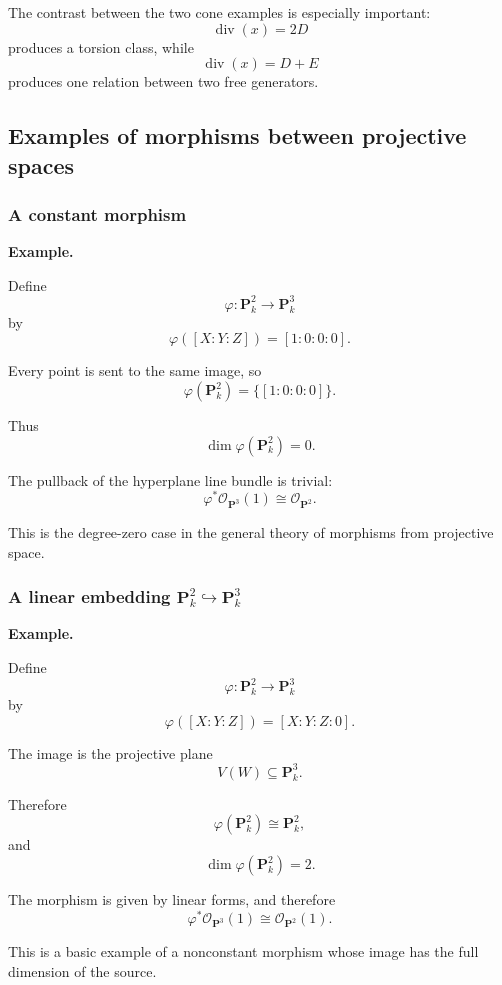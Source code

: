 \documentclass[12pt,a4paper]{article}
\theoremstyle{notespace}
\begin{document}
The contrast between the two cone examples is especially important:
\[
\operatorname{div}(x)=2D
\]
produces a torsion class, while
\[
\operatorname{div}(x)=D+E
\]
produces one relation between two free generators.

\subsection{Examples of morphisms between projective spaces}

\subsubsection{A constant morphism}

\textbf{Example.}

Define
\[
\varphi:\mathbf P^2_k\longrightarrow\mathbf P^3_k
\]
by
\[
\varphi([X:Y:Z])=[1:0:0:0].
\]

Every point is sent to the same image, so
\[
\varphi(\mathbf P^2_k)=\{[1:0:0:0]\}.
\]

Thus
\[
\dim\varphi(\mathbf P^2_k)=0.
\]

The pullback of the hyperplane line bundle is trivial:
\[
\varphi^*\mathcal O_{\mathbf P^3}(1)
\cong
\mathcal O_{\mathbf P^2}.
\]

This is the degree-zero case in the general theory of morphisms from projective space.

\subsubsection{A linear embedding \(\mathbf P^2_k\hookrightarrow\mathbf P^3_k\)}

\textbf{Example.}

Define
\[
\varphi:\mathbf P^2_k\longrightarrow\mathbf P^3_k
\]
by
\[
\varphi([X:Y:Z])=[X:Y:Z:0].
\]

The image is the projective plane
\[
V(W)\subseteq\mathbf P^3_k.
\]

Therefore
\[
\varphi(\mathbf P^2_k)\cong\mathbf P^2_k,
\]
and
\[
\dim\varphi(\mathbf P^2_k)=2.
\]

The morphism is given by linear forms, and therefore
\[
\varphi^*\mathcal O_{\mathbf P^3}(1)
\cong
\mathcal O_{\mathbf P^2}(1).
\]

This is a basic example of a nonconstant morphism whose image has the full dimension of the source.
\end{document}
